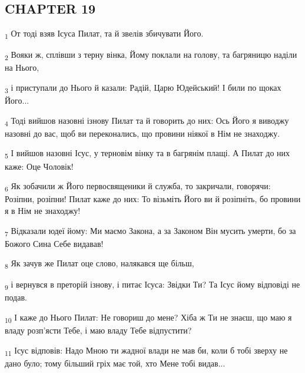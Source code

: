 \subsection{CHAPTER 19}
\begin{tcolorbox}
\textsubscript{1} От тоді взяв Ісуса Пилат, та й звелів збичувати Його.
\end{tcolorbox}
\begin{tcolorbox}
\textsubscript{2} Вояки ж, сплівши з терну вінка, Йому поклали на голову, та багряницю наділи на Нього,
\end{tcolorbox}
\begin{tcolorbox}
\textsubscript{3} і приступали до Нього й казали: Радій, Царю Юдейський! І били по щоках Його...
\end{tcolorbox}
\begin{tcolorbox}
\textsubscript{4} Тоді вийшов назовні ізнову Пилат та й говорить до них: Ось Його я виводжу назовні до вас, щоб ви переконались, що провини ніякої в Нім не знаходжу.
\end{tcolorbox}
\begin{tcolorbox}
\textsubscript{5} І вийшов назовні Ісус, у терновім вінку та в багрянім плащі. А Пилат до них каже: Оце Чоловік!
\end{tcolorbox}
\begin{tcolorbox}
\textsubscript{6} Як зобачили ж Його первосвященики й служба, то закричали, говорячи: Розіпни, розіпни! Пилат каже до них: То візьміть Його ви й розіпніть, бо провини я в Нім не знаходжу!
\end{tcolorbox}
\begin{tcolorbox}
\textsubscript{7} Відказали юдеї йому: Ми маємо Закона, а за Законом Він мусить умерти, бо за Божого Сина Себе видавав!
\end{tcolorbox}
\begin{tcolorbox}
\textsubscript{8} Як зачув же Пилат оце слово, налякався ще більш,
\end{tcolorbox}
\begin{tcolorbox}
\textsubscript{9} і вернувся в преторій ізнову, і питає Ісуса: Звідки Ти? Та Ісус йому відповіді не подав.
\end{tcolorbox}
\begin{tcolorbox}
\textsubscript{10} І каже до Нього Пилат: Не говориш до мене? Хіба ж Ти не знаєш, що маю я владу розп'ясти Тебе, і маю владу Тебе відпустити?
\end{tcolorbox}
\begin{tcolorbox}
\textsubscript{11} Ісус відповів: Надо Мною ти жадної влади не мав би, коли б тобі зверху не дано було; тому більший гріх має той, хто Мене тобі видав...
\end{tcolorbox}
